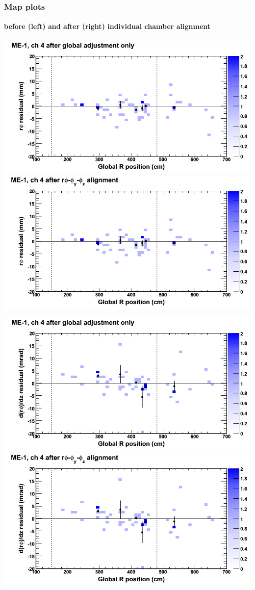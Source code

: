 \documentclass[compress]{beamer}
\begin{document}
\begin{frame}
\frametitle{Map plots}
\framesubtitle{before (left) and after (right) individual chamber alignment}
\includegraphics[width=0.5\linewidth]{ringmapplots_3dof/before_CSCvsr_mem1ch04_x.png} \includegraphics[width=0.5\linewidth]{ringmapplots_3dof/after_CSCvsr_mem1ch04_x.png}

\includegraphics[width=0.5\linewidth]{ringmapplots_3dof/before_CSCvsr_mem1ch04_dxdz.png} \includegraphics[width=0.5\linewidth]{ringmapplots_3dof/after_CSCvsr_mem1ch04_dxdz.png}
\end{frame}
\end{document}

